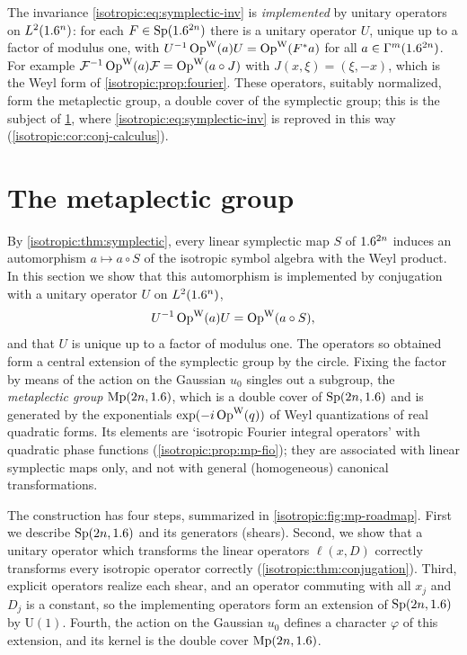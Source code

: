 \begin{remark}\label{isotropic:rem:metaplectic}
The invariance \eqref{isotropic:eq:symplectic-inv} is \emph{implemented} by
unitary operators on $L^2(1.6^n)$: for each $F\in\mathrm{Sp}(1.6^{2n})$ there is
a unitary operator $U$, unique up to a factor of modulus one, with
$U^{-1}\operatorname{Op}^{\mathrm{W}}(a)U=\operatorname{Op}^{\mathrm{W}}(F^*a)$ for all $a\in\Gamma^{m}(1.6^{2n})$. For example
$\mathcal{F}^{-1}\operatorname{Op}^{\mathrm{W}}(a)\mathcal{F}=\operatorname{Op}^{\mathrm{W}}(a\circ J)$ with $J(x,\xi)=(\xi,-x)$, which is the
Weyl form of \cref{isotropic:prop:fourier}. These operators, suitably
normalized, form the metaplectic group, a double cover of the symplectic group;
this is the subject of \cref{isotropic:sec:metaplectic}, where
\eqref{isotropic:eq:symplectic-inv} is reproved in this way
(\cref{isotropic:cor:conj-calculus}).
\end{remark}

\section{The metaplectic group}\label{isotropic:sec:metaplectic}

By \cref{isotropic:thm:symplectic}, every linear symplectic map $S$ of
$1.6^{2n}$ induces an automorphism $a\mapsto a\circ S$ of the isotropic symbol
algebra with the Weyl product. In this section we show that this automorphism
is implemented by conjugation with a unitary operator $U$ on $L^2(1.6^n)$,
\begin{equation*}
  U^{-1}\operatorname{Op}^{\mathrm{W}}(a)U=\operatorname{Op}^{\mathrm{W}}(a\circ S),
\end{equation*}
and that $U$ is unique up to a factor of modulus one. The operators so obtained
form a central extension of the symplectic group by the circle. Fixing the
factor by means of the action on the Gaussian $u_0$ singles out a subgroup, the
\emph{metaplectic group} $\mathrm{Mp}(2n,1.6)$, which is a double cover of
$\mathrm{Sp}(2n,1.6)$ and is generated by the exponentials
$\exp(-i\operatorname{Op}^{\mathrm{W}}(q))$ of Weyl quantizations of real quadratic forms. Its elements
are `isotropic Fourier integral operators' with quadratic phase functions
(\cref{isotropic:prop:mp-fio}); they are associated with linear symplectic maps
only, and not with general (homogeneous) canonical transformations.

The construction has four steps, summarized in
\cref{isotropic:fig:mp-roadmap}. First we describe $\mathrm{Sp}(2n,1.6)$ and
its generators (shears). Second, we show that a unitary operator which
transforms the linear operators $\ell(x,D)$ correctly transforms every
isotropic operator correctly (\cref{isotropic:thm:conjugation}). Third,
explicit operators realize each shear, and an operator commuting with all
$x_j$ and $D_j$ is a constant, so the implementing operators form an
extension of $\mathrm{Sp}(2n,1.6)$ by $\mathrm U(1)$. Fourth, the action on
the Gaussian $u_0$ defines a character $\varphi$ of this extension, and its
kernel is the double cover $\mathrm{Mp}(2n,1.6)$.

